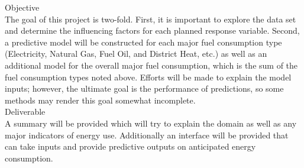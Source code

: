 {\Large {Objective}}
\\[0.125in]
The goal of this project is two-fold.  First, it is important to explore the data set and determine the influencing factors for each planned response variable.  Second, a predictive model will be constructed for each major fuel consumption type (Electricity, Natural Gas, Fuel Oil, and District Heat, etc.) as well as an additional model for the overall major fuel consumption, which is the sum of the fuel consumption types noted above.  Efforts will be made to explain the model inputs; however, the ultimate goal is the performance of predictions, so some methods may render this goal somewhat incomplete.
\\[0.25in]
{\Large {Deliverable}}
\\[0.125in]
A summary will be provided which will try to explain the domain as well as any major indicators of energy use. Additionally an interface will be provided that can take inputs and provide predictive outputs on anticipated energy consumption.
